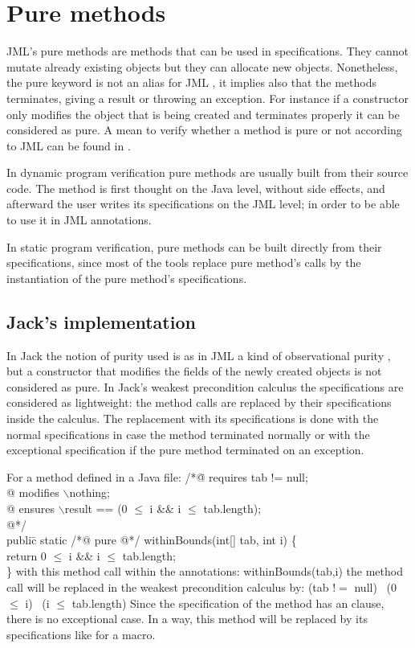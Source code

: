 \section{Pure methods}
JML's pure methods are methods that can be used in specifications.
They cannot mutate already existing objects but they can allocate new objects.
Nonetheless, the pure keyword is not an alias for JML 
, 
it implies also that the methods terminates, giving a result or throwing an 
exception.
For instance if a constructor only modifies the object that is being 
created and terminates properly
it can be considered as pure.
A mean to verify whether a method is pure or not according to JML
can be found in \cite{salcianu05}. 



In dynamic program verification pure methods are usually built from 
their source code. 
The method is first thought on the Java level, without side effects, 
and afterward the user writes its specifications on the JML level; 
in order to be able to use it in JML annotations.

In static program verification,  pure methods can be built directly
from their specifications, since most of the tools replace pure method's calls 
 by the instantiation of the pure method's specifications.


\subsection{Jack's implementation}
In Jack the notion of purity used is as in JML a kind of observational 
purity \cite{naumann05}, but a constructor that modifies the fields 
of the newly created objects is not considered as pure.
In Jack's weakest precondition calculus the specifications are considered 
as lightweight: the method calls are replaced by their specifications 
inside the calculus.
The replacement with its specifications is done with the normal 
specifications in case the method terminated normally or with the 
exceptional specification if the pure method terminated on an exception.
 
For a method defined in a Java file: 
\btab
 /*\=@ requires tab != null;\+\\
  @  modifies $\backslash$nothing;\\
  @ ensures   $\backslash$result == (0 $\le$ i \&\& i $\le$ tab.length);\\
  @*/\-\\
publi\=c static /*@ pure @*/  withinBounds(int[] tab, int i) \{\+\\
       return 0 $\le$ i \&\& i $\le$ tab.length;\-\\
\}
\etab
with this method call within the annotations: 
\btab
withinBounds(tab,i)
\etab
the method call will be replaced in the weakest precondition calculus by:
\btab
(tab $!=$ null) \rarrow \ (0 $\le$ i) \conj \ (i $\le$ tab.length)
\etab
Since the specification
of the method has an  clause, there is no exceptional case.
In a way, this method will be replaced by its specifications like for a macro.



